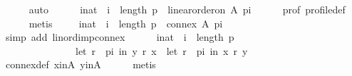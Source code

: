 \begin{isabellebody}
\ \ \ \ \isamarkupfalse%
\ auto\isanewline
\ \ \isamarkupfalse%
\ {}{\isacharcolon}{\kern0pt}\ {\isachardoublequoteopen}{\isasymforall}\ i{\isacharcolon}{\kern0pt}{\isacharcolon}{\kern0pt}nat\ {\isachardot}{\kern0pt}\ i\ {\isacharless}{\kern0pt}\ length\ p\ {\isasymlongrightarrow}\ linear{\isacharunderscore}{\kern0pt}order{\isacharunderscore}{\kern0pt}on\ A\ {\isacharparenleft}{\kern0pt}p{\isacharbang}{\kern0pt}i{\isacharparenright}{\kern0pt}{\isachardoublequoteclose}\isanewline
\ \ \ \ \isamarkupfalse%
\ prof\ profile{\isacharunderscore}{\kern0pt}def\isanewline
\ \ \ \ \isamarkupfalse%
\ metis\isanewline
\ \ \isamarkupfalse%
\ {\isachardoublequoteopen}{\isasymforall}\ i{\isacharcolon}{\kern0pt}{\isacharcolon}{\kern0pt}nat\ {\isachardot}{\kern0pt}\ i\ {\isacharless}{\kern0pt}\ length\ p\ {\isasymlongrightarrow}\ connex\ A\ {\isacharparenleft}{\kern0pt}p{\isacharbang}{\kern0pt}i{\isacharparenright}{\kern0pt}{\isachardoublequoteclose}\isanewline
\ \ \ \ \isamarkupfalse%
\ {\isacharparenleft}{\kern0pt}simp\ add{\isacharcolon}{\kern0pt}\ lin{\isacharunderscore}{\kern0pt}ord{\isacharunderscore}{\kern0pt}imp{\isacharunderscore}{\kern0pt}connex{\isacharparenright}{\kern0pt}\isanewline
\ \ \isamarkupfalse%
\ {}{\isacharcolon}{\kern0pt}\ {\isachardoublequoteopen}{\isasymforall}\ i{\isacharcolon}{\kern0pt}{\isacharcolon}{\kern0pt}nat\ {\isachardot}{\kern0pt}\ i\ {\isacharless}{\kern0pt}\ length\ p\ {\isasymlongrightarrow}\isanewline
\ \ \ \ \ \ \ \ \ \ \ \ \ \ {\isasymnot}\ {\isacharparenleft}{\kern0pt}let\ r\ {\isacharequal}{\kern0pt}\ {\isacharparenleft}{\kern0pt}p{\isacharbang}{\kern0pt}i{\isacharparenright}{\kern0pt}\ in\ {\isacharparenleft}{\kern0pt}y\ {\isasympreceq}\isactrlsub r\ x{\isacharparenright}{\kern0pt}{\isacharparenright}{\kern0pt}\ {\isasymlongrightarrow}\ {\isacharparenleft}{\kern0pt}let\ r\ {\isacharequal}{\kern0pt}\ {\isacharparenleft}{\kern0pt}p{\isacharbang}{\kern0pt}i{\isacharparenright}{\kern0pt}\ in\ {\isacharparenleft}{\kern0pt}x\ {\isasympreceq}\isactrlsub r\ y{\isacharparenright}{\kern0pt}{\isacharparenright}{\kern0pt}{\isachardoublequoteclose}\isanewline
\ \ \ \ \isamarkupfalse%
\ connex{\isacharunderscore}{\kern0pt}def\ x{\isacharunderscore}{\kern0pt}in{\isacharunderscore}{\kern0pt}A\ y{\isacharunderscore}{\kern0pt}in{\isacharunderscore}{\kern0pt}A\isanewline
\ \ \ \ \isamarkupfalse%
\ metis\isanewline
\ \ \isamarkupfalse%
\ {}\ \isamarkupfalse%

\end{isabellebody}
